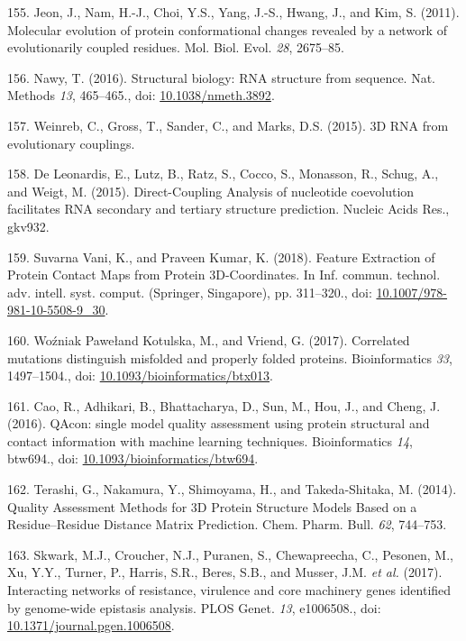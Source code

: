 \documentclass[11pt,a4paper,twoside]{book}
\theoremstyle{definition}
\theoremstyle{definition}
\theoremstyle{remark}
\begin{document}
\hypertarget{ref-Jeon2011a}{}
155. Jeon, J., Nam, H.-J., Choi, Y.S., Yang, J.-S., Hwang, J., and Kim,
S. (2011). Molecular evolution of protein conformational changes
revealed by a network of evolutionarily coupled residues. Mol. Biol.
Evol. \emph{28}, 2675--85.

\hypertarget{ref-Nawy2016}{}
156. Nawy, T. (2016). Structural biology: RNA structure from sequence.
Nat. Methods \emph{13}, 465--465., doi:
\href{https://doi.org/10.1038/nmeth.3892}{10.1038/nmeth.3892}.

\hypertarget{ref-Weinreb2015}{}
157. Weinreb, C., Gross, T., Sander, C., and Marks, D.S. (2015). 3D RNA
from evolutionary couplings.

\hypertarget{ref-DeLeonardis2015a}{}
158. De Leonardis, E., Lutz, B., Ratz, S., Cocco, S., Monasson, R.,
Schug, A., and Weigt, M. (2015). Direct-Coupling Analysis of nucleotide
coevolution facilitates RNA secondary and tertiary structure prediction.
Nucleic Acids Res., gkv932.

\hypertarget{ref-SuvarnaVani2018}{}
159. Suvarna Vani, K., and Praveen Kumar, K. (2018). Feature Extraction
of Protein Contact Maps from Protein 3D-Coordinates. In Inf. commun.
technol. adv. intell. syst. comput. (Springer, Singapore), pp.
311--320., doi:
\href{https://doi.org/10.1007/978-981-10-5508-9_30}{10.1007/978-981-10-5508-9\_30}.

\hypertarget{ref-Wozniak2017}{}
160. Woźniak Pawełand Kotulska, M., and Vriend, G. (2017). Correlated
mutations distinguish misfolded and properly folded proteins.
Bioinformatics \emph{33}, 1497--1504., doi:
\href{https://doi.org/10.1093/bioinformatics/btx013}{10.1093/bioinformatics/btx013}.

\hypertarget{ref-Cao2016}{}
161. Cao, R., Adhikari, B., Bhattacharya, D., Sun, M., Hou, J., and
Cheng, J. (2016). QAcon: single model quality assessment using protein
structural and contact information with machine learning techniques.
Bioinformatics \emph{14}, btw694., doi:
\href{https://doi.org/10.1093/bioinformatics/btw694}{10.1093/bioinformatics/btw694}.

\hypertarget{ref-Terashi2014a}{}
162. Terashi, G., Nakamura, Y., Shimoyama, H., and Takeda-Shitaka, M.
(2014). Quality Assessment Methods for 3D Protein Structure Models Based
on a Residue--Residue Distance Matrix Prediction. Chem. Pharm. Bull.
\emph{62}, 744--753.

\hypertarget{ref-Skwark2017}{}
163. Skwark, M.J., Croucher, N.J., Puranen, S., Chewapreecha, C.,
Pesonen, M., Xu, Y.Y., Turner, P., Harris, S.R., Beres, S.B., and
Musser, J.M. \emph{et al.} (2017). Interacting networks of resistance,
virulence and core machinery genes identified by genome-wide epistasis
analysis. PLOS Genet. \emph{13}, e1006508., doi:
\href{https://doi.org/10.1371/journal.pgen.1006508}{10.1371/journal.pgen.1006508}.
\end{document}
